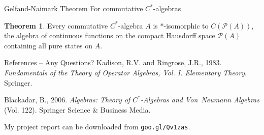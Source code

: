 \documentclass[11pt]{beamer}
\theoremstyle{definition}
\newtheorem{thm}{Theorem}
\renewcommand{\P}[1]{\mathscr{P}(#1)}
\begin{document}
\iffalse
\begin{frame} {Gelfand-Naimark Theorem} {Proof: Direct Sum}
	Proof concludes by taking `direct sum' representation over the representations 
	given by doing GNS construction to a subset of state space containing all pure 
	states. This gives a faithful representation.
\end{frame}\fi


\begin{frame} {Gelfand-Naimark Theorem} {For commutative $C^\ast$-algebras}
	\begin{thm}
		Every commutative $C^\ast$-algebra $A$ is $\ast$-isomorphic to $C(\P A)$, the 
		algebra of continuous functions on the compact Hausdorff space $\P A$ containing 
		all pure states on $A$. 
	\end{thm}
\end{frame} 


\begin{frame} {References -- Any Questions?}
	Kadison, R.V. and Ringrose, J.R., 1983. 
	\textit{Fundamentals of the Theory of Operator Algebras, Vol. I. Elementary Theory}. 
	Springer.
	
	Blackadar, B., 2006. 
	\textit{Algebras: Theory of $C^\ast$-Algebras and Von~Neumann 
	Algebras} (Vol. 122). 
	Springer Science \& Business Media.

	\vfill

	My project report can be downloaded from \texttt{goo.gl/Qv1zas}.
\end{frame}
\end{document}
